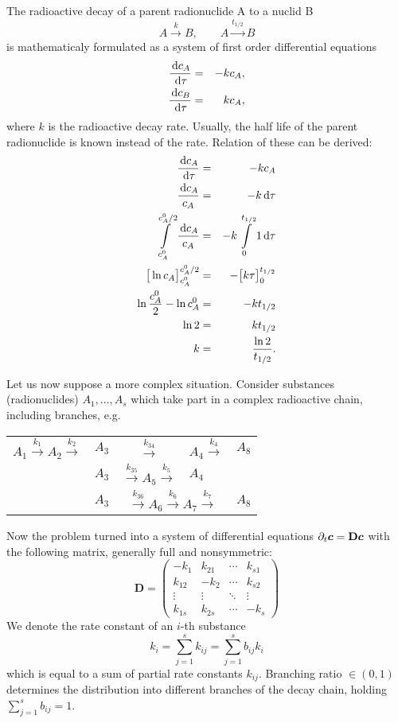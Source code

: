 The radioactive decay of a parent radionuclide A to a nuclid B
%
\[ A\xrightarrow{k} B, \qquad A\xrightarrow{t_{1/2}} B \]
%
is mathematicaly formulated as a system of first order differential equations
%
\begin{eqnarray} \label{eqn:halflife}
  \frac{\d c_A}{\d\tau} &=& -k c_A, \\
  \frac{\d c_B}{\d\tau} &=& k c_A,
\end{eqnarray}
%
where $k$ is the radioactive decay rate. Usually, the half life of the parent radionuclide  
is known instead of the rate. Relation of these can be derived:
%
\begin{eqnarray*}
    \frac{\,{\rm d} c_A}{\,{\rm d}\tau} &=& -k c_A\\
    \frac{\,{\rm d} c_A}{c_A} &=& -k \,{\rm d}\tau\\
    \int\limits_{c_A^0}^{c_A^0/2}\frac{\,{\rm d} c_A}{c_A} &=& -k\int\limits_{0}^{t_{1/2}} 1\,{\rm d}\tau\\
    \big[ \ln c_A\big]^{c_A^0/2}_{c_A^0} &=& -\big[k\tau\big]^{t_{1/2}}_{0}\\
    \ln\frac{c_A^0}{2} - \ln c_A^0 &=& - k t_{1/2}\\
    \ln 2 &=& k t_{1/2}\\
    k &=& \frac{\ln 2}{t_{1/2}}.
\end{eqnarray*}

Let us now suppose a more complex situation. Consider substances (radionuclides) $A_1,\ldots, A_s$ which take 
part in a complex radioactive chain, including branches, e.g.
\begin{center}
\begin{tabular}{rccll}
 $A_1\xrightarrow{k_1}A_2\xrightarrow{k_2}$ & $A_3$ & $ \xrightarrow{k_{34}}$ & $A_4\xrightarrow{k_4}$ & $A_8$ \\
 & $A_3$ & $\xrightarrow{k_{35}} A_5 \xrightarrow{k_{5}}$ & $A_4$ &\\
 & $A_3$ & \multicolumn{2}{c}{$\xrightarrow{k_{36}} A_6 \xrightarrow{k_{6}} A_7 \xrightarrow{k_{7}}$} & $A_8$
\end{tabular}
\end{center}
Now the problem turned into a system of differential equations $\partial_t \mathbf{\boldsymbol{c}}=\mathbf{D}\mathbf{\boldsymbol{c}}$ with the following
matrix, generally full and nonsymmetric:
\[
\mathbf{D} = \begin{pmatrix} -k_1 &k_{21}& \cdots & k_{s1} \\ 
                  k_{12} & -k_2 & \cdots & k_{s2} \\
                  \vdots &\vdots& \ddots & \vdots \\
                  k_{1s} &k_{2s}& \cdots & -k_s \end{pmatrix}
\]
We denote the rate constant of an $i$-th substance 
\[
  k_i=\sum_{j=1}^{s}k_{ij}=\sum_{j=1}^{s}b_{ij}k_i
\]
which is equal to a sum of partial rate constants $k_{ij}$. Branching ratio $\in(0,1)$ 
determines the distribution into different branches of the decay chain, holding $\sum_{j=1}^{s}b_{ij}=1$.


